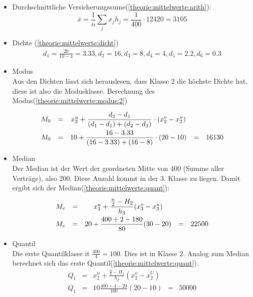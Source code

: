 \begin{itemize}
\item Durchschnittliche Versicherungssume(\autoref{theorie:mittelwerte:arith}):
\begin{equation*}
\overline{x} = \frac{1}{n}\sum_j x_jh_j = \frac{1}{400}\cdot 12420=3105
\end{equation*}
\item Dichte (\autoref{theorie:mittelwerte:dicht})
\begin{align*}
d_1=\frac{20}{10-4}=3.33, d_2=16, d_3=8, d_4=4, d_5=2.2, d_6=0.3
\end{align*}
\item Modus\\
Aus den Dichten lässt sich herauslesen, dass Klasse 2 die höchste Dichte hat, diese ist also die Modusklasse. Berechnung des Modus(\autoref{theorie:mittelwerte:modus:2})
\begin{equation*}
\ra{2}
\begin{array}{rcccl}
M_0 &=& x_2^u+\displaystyle\frac{d_2-d_1}{(d_1-d_1)+(d_2-d_3)}\cdot(x_2^o-x_2^u)&& \\
M_0 &=& 10+\displaystyle\frac{16-3.33}{(16-3.33)+(16-8)}\cdot(20-10) &=& 16130
\end{array}
\end{equation*}
\item Median\\
Der Median ist der Wert der geordneten Mitte von 400 (Summe aller Verträge), also 200. Diese Anzahl kommt in der 3. Klasse zu liegen. Damit ergibt sich der Median(\autoref{theorie:mittelwerte:quant}):
\begin{equation*}
\ra{2}
\begin{array}{rcccl}
M_e&=&x_3^u+\displaystyle\frac{\frac{n}{2}-H_2}{h_3}(x_3^o-x_3^u)&&\\
M_e&=&20+\displaystyle\frac{400\div2-180}{80}(30-20)&=&22500
\end{array}
\end{equation*}
\item Quantil\\
Die erste Quantilklasse it $\frac{400}{4}=100$. Dies ist in Klasse 2. Analog zum Median berechnet sich das erste Quantil(\autoref{theorie:mittelwerte:quant}).
\begin{equation*}
\begin{array}{rcccl}
Q_1&=&x_2^u+\displaystyle\frac{\frac{n}{4}-H_1}{h_2}(x_2^o-x_2^U)&&\\
Q_1&=&10\displaystyle\frac{400\div4-20}{160}(20-10)&=&50000
\end{array}

\end{equation*}
\end{itemize}
